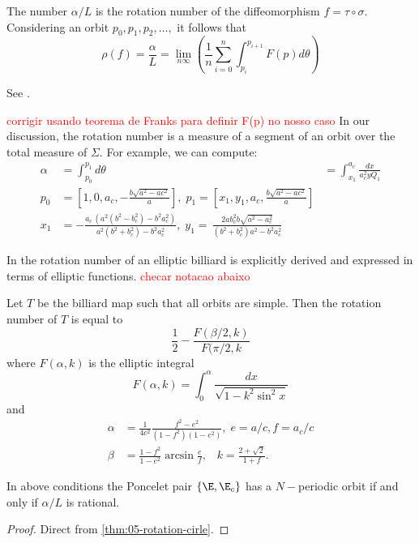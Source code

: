 \begin{remark} The number $\alpha/L$ is the rotation number of the diffeomorphism $f=\tau\circ\sigma$.   Considering an orbit $p_0, p_1, p_2,\ldots, $ it follows that
\[ \rho(f)=\frac{\alpha}{L}=\lim_{n\infty}\left(\frac{1}{n} \sum_{i=0}^{n}\int_{p_i}^{p_{i+1}} F(p)d\theta \right) \]

See \cite{franks-2003}. 

 

\textcolor{red}{corrigir usando teorema de Franks para definir F(p) no nosso caso}
In our discussion, 
  the rotation number is a measure of a segment of an orbit over the total measure of $\Sigma$. 
 For example, we can compute:
\begin{align*}
  \alpha &= \int_{p_0}^{p_{1}}d\theta&= \int_{x_1}^ {a_c}\frac{dx}{a_c^2y Q_1} \\ p_0&=\left[1,0,a_c,-\frac{b\sqrt{a^2 - ac^2}}{a}\right], \;p_1=\left[x_1,y_1, a_c,\frac{b\sqrt{a^2 - ac^2}}{a}\right]\\
    x_1&=-\frac {a_c\, \left( {a}^{2}({b}^{2}- b_c^{2})-{b}^{2}a_c^{2} \right) }{a^{2}(b^{2}+ b_c^{2})-b^{2}
a_c^2}, \; y_1= \,\frac {2 a b_c^{2}b\sqrt {{a}^{2}-a_c^{2}}}{ \left( {b}^{2}+b_c^{2} \right) {a}^{2}-{b}^{2}a_c^2}
    \end{align*}
 
\end{remark}
In  \cite{kolod1985} the rotation number of an elliptic billiard  is explicitly derived and expressed in terms of elliptic functions.
\textcolor{red}{checar notacao abaixo}
\begin{theorem}
  \label{th:cap5-rotation-number} Let $T$ be the billiard map such that all orbits are simple. Then
the rotation number of $T$ is equal to
\begin{equation}
    \frac{1}{2}- \frac{F(\beta/2,k)}{F(\pi/2,k}
\end{equation}
where $F(\alpha,k)$ is the elliptic integral
\[ F(\alpha,k)=\int_0^{\alpha} \frac{dx}{\sqrt{1-k^2 \sin^2x}}\]
and
\begin{align*}
\alpha&=\frac{1}{4c^2}\frac{f^2-e^2}{(1-f^2)(1-e^2)},\; e=a/c, f=a_c/c\\
\beta&=\frac{1-f^2 }{1-e^2}\arcsin{\frac{e}{f}},\;\;\; k=\frac{2+\sqrt{2}}{1+f}.    
\end{align*}
\end{theorem}
 
\begin{corollary} 
In   above conditions  the Poncelet pair $\{\E,\E_c\}$ has a $N-$periodic orbit if and only if $\alpha/L$ is rational.
\end{corollary}

 
\begin{proof} Direct from \cref{thm:05-rotation-cirle}.
\end{proof}
